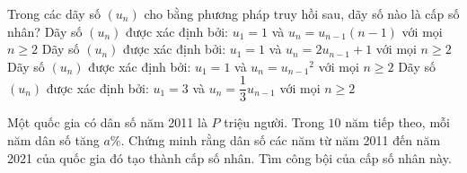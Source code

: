 

\begin{ex}%
	Trong các dãy số $\left(u_n\right)$ cho bằng phương pháp truy  hồi sau, dãy số nào là cấp số nhân?
	\choice 
		{Dãy số $\left(u_n\right)$  được xác định bởi: $u_1=1$ và $u_n=u_{n-1}(n-1)$ với mọi $n \ge 2$}
		{Dãy số $\left(u_n\right)$ được xác  định bởi: $u_1=1$ và $u_n=2u_{n-1}+1$ với mọi $n \ge 2$}
		{Dãy số $\left(u_n\right)$ được xác định bởi: $u_1=1$  và $u_n={u_{n-1}}^2$ với mọi $n \ge 2$}
		{\True Dãy số $\left(u_n\right)$ được  xác định bởi: $u_1=3$ và $u_n=\dfrac{1}{3}u_{n-1}$ với mọi $n \ge 2$}
\end{ex}



\begin{bt}%
	Một quốc gia có dân số năm 2011 là $P$ triệu người. Trong $10$ năm tiếp theo, mỗi năm dân số tăng $a \%$. Chứng minh rằng dân số các năm từ năm 2011 đến năm 2021 của quốc gia đó tạo thành cấp số nhân.  Tìm công bội của cấp số nhân này.
\end{bt}

